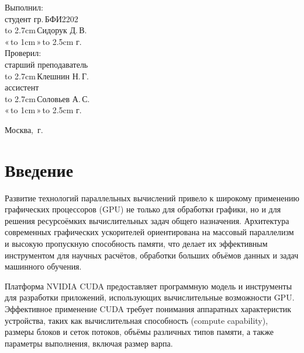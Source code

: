 \documentclass[14pt]{extarticle}
\makeatletter
\newcommand{\hrf}[1]{\hbox to #1{\hrulefill}} %
\newcounter{sectionc} %
\newcommand{\numbersections}{\renewcommand{\Hy@numberline}[1]{##1~}}
\newcommand{\nonumbersections}{\renewcommand{\Hy@numberline}[1]{}}
\let\oldsection\section
\renewcommand{\section}{\numbersections\oldsection}
\let\oldsectionc\sectionc
\renewcommand{\sectionc}{\nonumbersections\oldsectionc}
\renewcommand\tableofcontents{
	\pdfbookmark[sectionc]{\contentsname}{toc} %
	\sectionc*{\contentsname
		\@mkboth{\contentsname}{\contentsname}}
	\@starttoc{toc}
}
\makeatother
\begin{document}
\vfill %

\hfill %
\begin{minipage}{0.45\textwidth} %
	Выполнил:\\[2mm]
	студент гр.\,БФИ2202\\[2mm]
	\hrf{2.7cm}\,Сидорук Д.\,В.\\[2mm]
	«\,\hrf{1cm}\,»\,\hrf{2.5cm}\,\the\year{}\,г.\\[5mm]
	
	Проверил:\\[2mm]
	старший преподаватель\\[2mm]
	\hrf{2.7cm}\,Клешнин Н.\,Г.\\[2mm]
	ассистент\\[2mm]
	\hrf{2.7cm}\,Соловьев А.\,С.\\[2mm]
	«\,\hrf{1cm}\,»\,\hrf{2.5cm}\,\the\year{}\,г.
\end{minipage}%

\vfill

\centerline{Москва, \the\year{}\,г.} %
\thispagestyle{empty} %
\newpage %
\tableofcontents %
\newpage %

\section{Введение}

Развитие технологий параллельных вычислений привело к широкому применению графических процессоров (GPU) не только для обработки графики, но и для решения ресурсоёмких вычислительных задач общего назначения. Архитектура современных графических ускорителей ориентирована на массовый параллелизм и высокую пропускную способность памяти, что делает их эффективным инструментом для научных расчётов, обработки больших объёмов данных и задач машинного обучения.

Платформа NVIDIA CUDA предоставляет программную модель и инструменты для разработки приложений, использующих вычислительные возможности GPU. Эффективное применение CUDA требует понимания аппаратных характеристик устройства, таких как вычислительная способность (compute capability), размеры блоков и сеток потоков, объёмы различных типов памяти, а также параметры выполнения, включая размер варпа.
\end{document}
